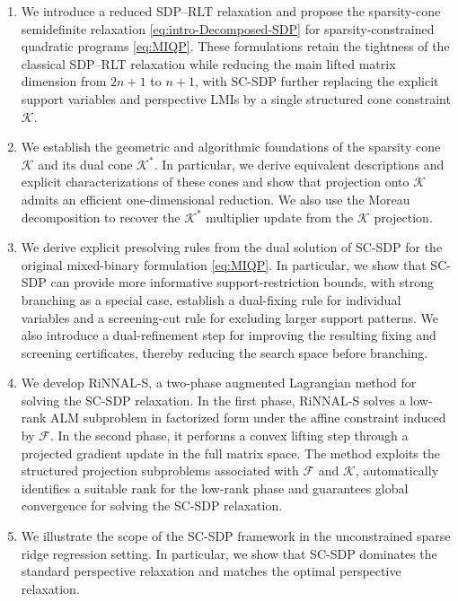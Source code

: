 \documentclass[11pt]{article}
\def\K{\mathcal{K}}
\def\F{\mathcal{F}}
\theoremstyle{plain}
\begin{document}
\begin{enumerate}[leftmargin=*, itemsep=2pt, topsep=4pt]
    \item We introduce a reduced SDP--RLT relaxation and propose the sparsity-cone semidefinite relaxation \eqref{eq:intro-Decomposed-SDP} for sparsity-constrained quadratic programs \eqref{eq:MIQP}. These formulations retain the tightness of the classical SDP--RLT relaxation while reducing the main lifted matrix dimension from $2n+1$ to $n+1$, with SC-SDP further replacing the explicit support variables and perspective LMIs by a single structured cone constraint $\K$.

    \item We establish the geometric and algorithmic foundations of the sparsity cone $\K$ and its dual cone $\K^*$. In particular, we derive equivalent descriptions and explicit characterizations of these cones and show that projection onto $\K$ admits an efficient one-dimensional reduction. We also use the Moreau decomposition to recover the $\K^*$ multiplier update from the $\K$ projection.

    \item We derive explicit presolving rules from the dual solution of SC-SDP for the original mixed-binary formulation \eqref{eq:MIQP}. In particular, we show that SC-SDP can provide more informative support-restriction bounds, with strong branching as a special case, establish a dual-fixing rule for individual variables and a screening-cut rule for excluding larger support patterns. We also introduce a dual-refinement step for improving the resulting fixing and screening certificates, thereby reducing the search space before branching.

    \item We develop RiNNAL-S, a two-phase augmented Lagrangian method for solving the SC-SDP relaxation. In the first phase, RiNNAL-S solves a low-rank ALM subproblem in factorized form under the affine constraint induced by $\F$. In the second phase, it performs a convex lifting step through a projected gradient update in the full matrix space. The method exploits the structured projection subproblems associated with $\F$ and $\K$, automatically identifies a suitable rank for the low-rank phase and guarantees global convergence for solving the SC-SDP relaxation.
    
    \item We illustrate the scope of the SC-SDP framework in the unconstrained sparse ridge regression setting. In particular, we show that SC-SDP dominates the standard perspective relaxation and matches the optimal perspective relaxation.
    

\end{enumerate}
\end{document}
